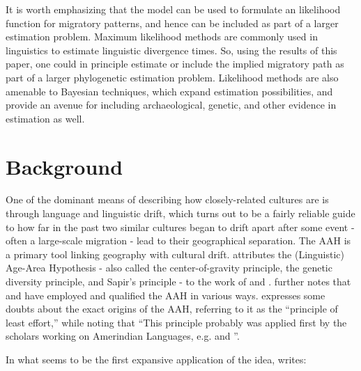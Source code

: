 \documentclass[11pt]{article}
\begin{document}
It is worth emphasizing that the model can be used to formulate an likelihood function for migratory patterns, and hence can be included as part of a larger estimation problem. Maximum likelihood methods are commonly used in linguistics to estimate linguistic divergence times. So, using the results of this paper, one could in principle estimate or include the implied migratory path as part of a larger phylogenetic estimation problem. Likelihood methods are also amenable to Bayesian techniques, which expand estimation possibilities, and provide an avenue for including archaeological, genetic, and other evidence in estimation as well. 

\section{Background}

One of the dominant means of describing how closely-related cultures are is through language and linguistic drift, which turns out to be a fairly reliable guide to how far in the past two similar cultures began to drift apart after some event - often a large-scale migration - lead to their geographical separation. The AAH is a primary tool linking geography with cultural drift. \citet[p.12]{trask00} attributes the (Linguistic) Age-Area Hypothesis - also called the center-of-gravity principle, the genetic diversity principle, and Sapir's principle - to the work of \cite{latham51}  and \cite{sapir16}. \cite{trask00} further notes that \cite{mallory97} and \cite{nichols97} have employed and qualified the AAH in various ways.   \citet[p.336]{dimmendaal11} expresses some doubts about the exact origins of the AAH, referring to it as the ``principle of least effort,'' while noting that ``This principle probably was applied first by the scholars working on Amerindian Languages, e.g. \cite{sapir16} and \cite{dyen56}''.

In what seems to be the first expansive  application of the idea, \cite{sapir16} writes:
\end{document}
